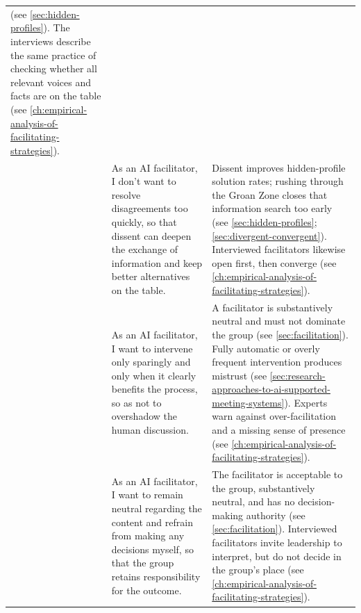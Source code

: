 \begin{xltabular}{\textwidth}{@{}
    >{\small\raggedright\arraybackslash}p{1.15cm}
    >{\small\raggedright\arraybackslash}X
    >{\small\raggedright\arraybackslash}X
  @{}}
  (see \autoref{sec:hidden-profiles}).
  The interviews describe the same practice of checking whether all relevant voices and facts are on
  the table
  (see \autoref{ch:empirical-analysis-of-facilitating-strategies}). \\
  \usblocksep
  & As an AI facilitator, I don't want to resolve disagreements too quickly, so that dissent can deepen the
  exchange of information and keep better alternatives on the table.
  & Dissent improves hidden-profile solution rates; rushing through the Groan Zone closes that
  information search too early
  (see \autoref{sec:hidden-profiles}; \autoref{sec:divergent-convergent}).
  Interviewed facilitators likewise open first, then converge
  (see \autoref{ch:empirical-analysis-of-facilitating-strategies}). \\
  \usblocksep
  & As an AI facilitator, I want to intervene only sparingly and only when it clearly benefits the process,
  so as not to overshadow the human discussion.
  & A facilitator is substantively neutral and must not dominate the group
  (see \autoref{sec:facilitation}).
  Fully automatic or overly frequent intervention produces mistrust
  (see \autoref{sec:research-approaches-to-ai-supported-meeting-systems}).
  Experts warn against over-facilitation and a missing sense of presence
  (see \autoref{ch:empirical-analysis-of-facilitating-strategies}). \\
  \usblocksep
  & As an AI facilitator, I want to remain neutral regarding the content and refrain from making any
  decisions myself, so that the group retains responsibility for the outcome.
  & The facilitator is acceptable to the group, substantively neutral, and has no decision-making
  authority
  (see \autoref{sec:facilitation}).
  Interviewed facilitators invite leadership to interpret, but do not decide in the group's place
  (see \autoref{ch:empirical-analysis-of-facilitating-strategies}). \\
\end{xltabular}
\renewcommand{\arraystretch}{1}
